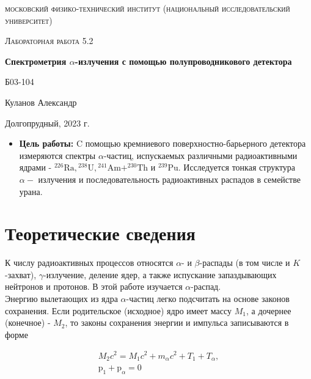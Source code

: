 \documentclass[a4paper, 12pt]{article}
\begin{document}
\begin{titlepage}
	\centering
	\vspace{5cm}
	{\scshape\LARGE московский физико-технический институт (национальный исследовательский университет) \par}
	\vspace{6cm}
	{\scshape\Large Лабораторная работа 5.2 \par}
	{\huge\bfseries Спектрометрия $\alpha$-излучения с помощью полупроводникового детектора\par}
	\vspace{1cm}
	\vfill
\begin{flushright}
	{\large Б03-104}\par
	\vspace{0.3cm}
	{\LARGE Куланов Александр}
\end{flushright}
	

	\vfill


	Долгопрудный, 2023 г.
\end{titlepage}

\begin{itemize}
	\item \textbf{Цель работы:} C помощью кремниевого поверхностно-барьерного детектора измеряются спектры $\alpha$-частиц, испускаемых различными радиоактивными ядрами - ${ }^{226} \mathrm{Ra},{ }^{238} \mathrm{U},{ }^{241} \mathrm{Am} + ^{230} \mathrm{Th}$ и ${ }^{239} \mathrm{Pu}$. Исследуется тонкая структура $\alpha-$ излучения и последовательность радиоактивных распадов в семействе урана.
\end{itemize}

\section{Теоретические сведения}
К числу радиоактивных процессов относятся $\alpha$- и $\beta$-распады (в том числе и $K$-захват), $\gamma$-излучение, деление ядер, а также испускание запаздывающих нейтронов и протонов. В этой работе изучается $\alpha$-распад.\\
Энергию вылетающих из ядра $\alpha$-частиц легко подсчитать на основе законов сохранения. Если родительское (исходное) ядро имеет массу $M_1$, а дочернее (конечное) - $M_2$, то законы сохранения энергии и импульса записываются в форме

$$
\begin{gathered}
M_2 c^2=M_1 c^2+m_\alpha c^2+T_1+T_\alpha, \\
\mathrm{p}_1+\mathrm{p}_\alpha=0
\end{gathered}
$$
\end{document}
